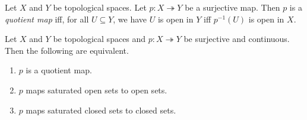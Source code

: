 \begin{df}
  Let $X$ and $Y$ be topological spaces. Let $p : X \twoheadrightarrow Y$ be
  a
  surjective map. Then $p$ is a \emph{quotient map} iff, for all $U \subseteq
  Y$, we have $U$ is open in $Y$ iff $p^{-1}(U)$ is open in $X$.
\end{df}

\begin{lm}
  \label{lm:topology:quotient:saturated}
  Let $X$ and $Y$ be topological spaces and $p : X \twoheadrightarrow Y$ be
  surjective and continuous. Then the following are equivalent.
  \begin{enumerate}
    \item $p$ is a quotient map.
    \item $p$ maps saturated open sets to open sets.
    \item $p$ maps saturated closed sets to closed sets.
  \end{enumerate}
\end{lm}

